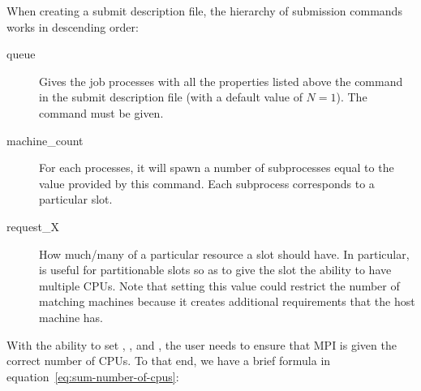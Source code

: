 When creating a submit description file, the hierarchy of submission commands
works in descending order:
\begin{description}
\item[queue ] Gives the job  processes with all the properties
listed above the  command in the submit description file (with 
a default value of $N=1$). The command  must be given.
\item[machine\_count] For each processes, it will spawn a number of subprocesses
equal to the value provided by this command. Each subprocess corresponds to a
particular slot.
\item[request\_X] How much/many of a particular resource a slot should have. In 
particular,  is useful for partitionable slots so as to
give the slot the ability to have multiple CPUs. Note that setting this value 
could restrict the number of matching machines because it creates additional
requirements that the host machine has.
\end{description}


With the ability to set , , and 
, the user needs to ensure that MPI is given the 
correct number of CPUs. To that end, we have a brief formula in 
equation~\ref{eq:sum-number-of-cpus}:

